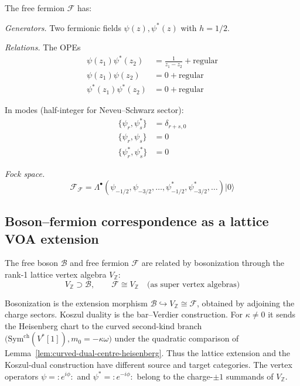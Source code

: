 The free fermion $\mathcal{F}$ has:

\emph{Generators.} Two fermionic fields $\psi(z), \psi^*(z)$ with $h = 1/2$.

\emph{Relations.} The OPEs
\begin{align}
\psi(z_1)\psi^*(z_2) &= \frac{1}{z_1-z_2} + \text{regular} \\
\psi(z_1)\psi(z_2) &= 0 + \text{regular} \\
\psi^*(z_1)\psi^*(z_2) &= 0 + \text{regular}
\end{align}

In modes (half-integer for Neveu--Schwarz sector):
\begin{align}
\{\psi_r, \psi^*_s\} &= \delta_{r+s,0} \\
\{\psi_r, \psi_s\} &= 0 \\
\{\psi^*_r, \psi^*_s\} &= 0
\end{align}

\emph{Fock space.}
\[
\mathcal{F}_{\mathcal{F}} = \Lambda^{\bullet}(\psi_{-1/2}, \psi_{-3/2}, \ldots, \psi^*_{-1/2}, \psi^*_{-3/2}, \ldots) |0\rangle
\]

\subsection{Boson--fermion correspondence as a lattice VOA extension}

\begin{theorem}\label{thm:boson-fermion-lattice}
The free boson $\mathcal{B}$ and free fermion $\mathcal{F}$ are related by bosonization through the rank-1 lattice vertex algebra $V_{\mathbb{Z}}$:
\[
V_{\mathbb{Z}} \supset \mathcal{B}, \qquad \mathcal{F} \cong V_{\mathbb{Z}} \quad \text{(as super vertex algebras)}
\]
\end{theorem}

\begin{remark}
Bosonization is the extension morphism
$\mathcal B\hookrightarrow V_{\mathbb Z}\cong\mathcal F$, obtained by
adjoining the charge sectors.  Koszul duality is the bar--Verdier
construction.  For $\kappa\neq0$ it sends the Heisenberg chart to the
curved second-kind branch
$\bigl(\mathrm{Sym}^{\mathrm{ch}}(V^*[1]),m_0=-\kappa\omega\bigr)$
under the quadratic comparison of
Lemma~\ref{lem:curved-dual-centre-heisenberg}.  Thus the lattice
extension and the Koszul-dual construction have different source and
target categories.  The vertex operators
$\psi={:}e^{i\phi}{:}$ and $\psi^*={:}e^{-i\phi}{:}$ belong to the
charge-$\pm1$ summands of $V_{\mathbb Z}$.
\end{remark}

